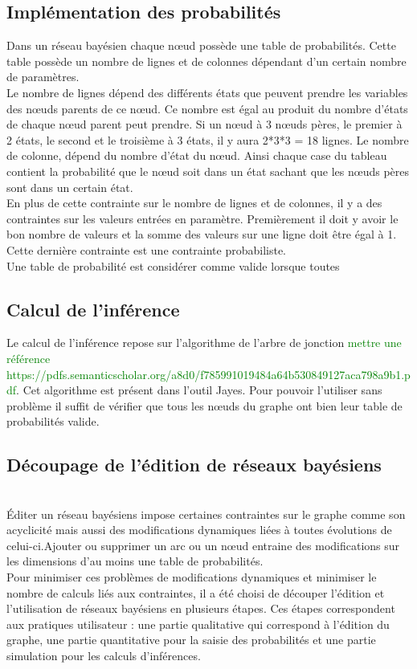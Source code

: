 \documentclass[conference]{IEEEtran}
\begin{document}
\subsection{Implémentation des probabilités}
Dans un réseau bayésien chaque nœud possède une table de probabilités. Cette table possède un nombre de lignes et de colonnes dépendant d'un certain nombre de paramètres. \\
Le nombre de lignes dépend des différents états que peuvent prendre les variables des nœuds parents de ce nœud. Ce nombre est égal au produit du nombre d'états de chaque nœud parent peut prendre. Si un nœud à 3 nœuds pères, le premier à 2 états, le second et le troisième à 3 états, il y aura 2*3*3 = 18 lignes. Le nombre de colonne, dépend du nombre d'état du nœud. Ainsi chaque case du tableau contient la probabilité que le nœud soit dans un état sachant que les nœuds pères sont dans un certain état.\\
En plus de cette contrainte sur le nombre de lignes et de colonnes, il y a des contraintes sur les valeurs entrées en paramètre. Premièrement il doit y avoir le bon nombre de valeurs et la somme des valeurs sur une ligne doit être égal à 1. Cette dernière contrainte est une contrainte probabiliste. \\  
Une table de probabilité est considérer comme valide lorsque toutes  

\subsection{Calcul de l'inférence}
Le calcul de l'inférence repose sur l'algorithme de l'arbre de jonction \textcolor{green}{mettre une référence https://pdfs.semanticscholar.org/a8d0/f785991019484a64b530849127aca798a9b1.pdf}. Cet algorithme est présent dans l'outil Jayes. Pour pouvoir l'utiliser sans problème il suffit de vérifier que tous les nœuds du graphe ont bien leur table de probabilités valide. 

\subsection{Découpage de l'édition de réseaux bayésiens \hfill}
\\
Éditer un réseau bayésiens impose certaines contraintes sur le graphe comme son acyclicité mais aussi des modifications dynamiques liées à toutes évolutions de celui-ci.Ajouter ou supprimer un arc ou un nœud entraine des modifications sur les dimensions d'au moins une table de probabilités. \\
Pour minimiser ces problèmes de modifications dynamiques et minimiser le nombre de calculs liés aux contraintes, il a été choisi de découper l'édition et l'utilisation de réseaux bayésiens en plusieurs étapes. Ces étapes correspondent aux pratiques utilisateur  : une partie qualitative qui correspond à  l'édition du graphe, une partie quantitative pour la saisie des probabilités et une partie simulation pour les calculs d'inférences. \\
\end{document}

